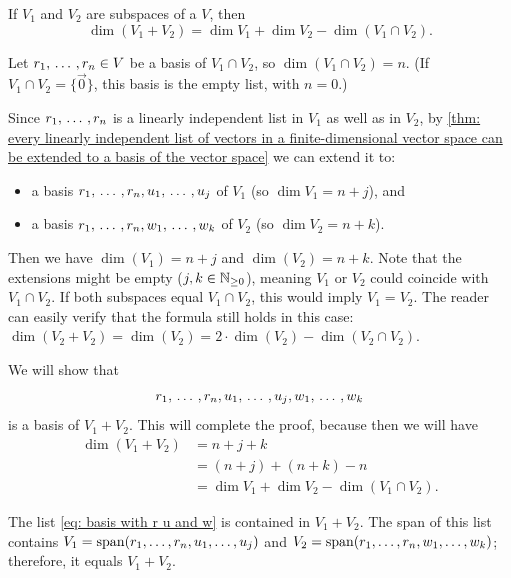 \begin{thm} 
\label{thm: dimension of a sum of subspaces}
If $V_1$ and $V_2$ are subspaces of a \fdvs $V$, then
\begin{equation}
  \dim (V_1 + V_2) = \dim V_1 + \dim V_2 - \dim (V_1 \cap V_2).
\end{equation}
\end{thm}
\begin{prf}
Let $r_1, {\, \ldots \,\,}, r_n \in V$ be a basis of $V_1 \cap V_2$, so $\dim(V_1 \cap V_2) = n$.
(If $V_1 \cap V_2 = \{ \vec 0 \}$, this basis is the empty list, with $n = 0$.)

Since $r_1, {\, \ldots \,\,}, r_n$ is a linearly independent list in $V_1$ as well as in $V_2$, by \ref{thm: every linearly independent list of vectors in a finite-dimensional vector space can be extended to a basis of the vector space} we can extend it to:
\begin{itemize}
  \item a basis $r_1, {\, \ldots \,\,}, r_n, u_1, {\, \ldots \,\,}, u_j$ of $V_1$ (so $\dim V_1 = n+j$), and
  \item a basis $r_1, {\, \ldots \,\,}, r_n, w_1, {\, \ldots \,\,}, w_k$ of $V_2$ (so $\dim V_2 = n+k$).
\end{itemize}

Then we have $\dim (V_1) = n+j$ and $\dim(V_2) = n+k$. Note that the extensions might be empty ($j,k \in \mathbb{N}_{\geq 0}$), meaning $V_1$ or $V_2$ could coincide with $V_1 \cap V_2$. If both subspaces equal $V_1 \cap V_2$, this would imply $V_1 = V_2$. The reader can easily verify that the formula still holds in this case: $\dim (V_2+V_2) = \dim (V_2) = 2 \cdot \dim (V_2) - \dim (V_2 \cap V_2)$.

We will show that
\begin{equation}
  \label{eq: basis with r u and w}
  r_1, {\, \ldots \,\,}, r_n, u_1, {\, \ldots \,\,}, u_j, w_1, {\, \ldots \,\,}, w_k
\end{equation}
is a basis of $V_1 + V_2$. This will complete the proof, because then we will have
\begin{equation}
  \begin{aligned}
    \dim (V_1 + V_2) &= n + j + k \\
    &= (n+j) + (n+k) - n \\
    &= \dim V_1 + \dim V_2 - \dim (V_1 \cap V_2).
  \end{aligned}
\end{equation}

The list \eqref{eq: basis with r u and w} is contained in $V_1 + V_2$. The span of this list contains $V_1 = \operatorname{span} (r_1, \dots, r_n, u_1, \dots, u_j)$ and $V_2 = \operatorname{span} (r_1, \dots, r_n, w_1, \dots, w_k)$; therefore, it equals $V_1 + V_2$.


\end{prf}

